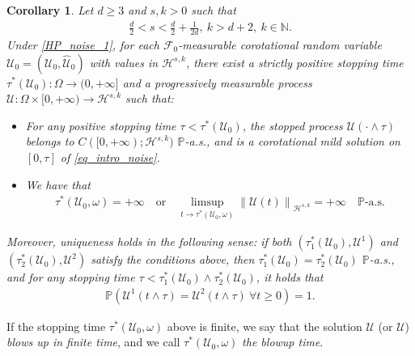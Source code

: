 \documentclass[12pt,reqno]{amsart}
\theoremstyle{plain}
\theoremstyle{remark}
\theoremstyle{plain}
\newtheorem{corollary}[theorem]{Corollary}
\theoremstyle{definition}
\numberwithin{equation}{section}
\numberwithin{equation}{section}
\def\N{{\mathbb N}}
\newcommand{\norm}[1]{\left\|#1\right\|}
\newcommand{\HH}{\mathcal{H}}
\begin{document}
 	\begin{corollary}\label{corollary_well_posed}
		Let $d\geq 3$ and $s,k>0$ such that 
		\begin{align*}
			\frac{d}{2}<s<\frac{d}{2}+\frac{1}{2d},\ k>d+2,\ k\in \N.
		\end{align*}
		Under \autoref{HP_noise_1},
		for each $\mathcal{F}_0$-measurable corotational random variable $\boldsymbol{\mathcal{U}}_0=(\mathcal{U}_0,\mathcal{\hat{U}}_{0})$ with values in $\HH^{s,k}$, there exist a strictly positive stopping time $\tau^*(\boldsymbol{\mathcal{U}}_0):\Omega\rightarrow (0,+\infty]$ and a progressively measurable process $\boldsymbol{\mathcal{U}}:\Omega\times [0,+\infty)\rightarrow \HH^{s,k}$ such that:
		\begin{itemize}[leftmargin=2em]
			\setlength{\itemsep}{1mm}
			\item[i)]  For any positive stopping time $\tau < \tau^*(\boldsymbol{\mathcal{U}}_0)$, the stopped process $\boldsymbol{\mathcal{U}}(\cdot \wedge \tau)$ belongs to $C([0, +\infty); \HH^{s,k})$ $\mathbb{P}$-a.s., and is a corotational mild solution on $[0, \tau]$ of \eqref{eq_intro_noise}.
			\item[ii)] We have that
			\begin{align*}
				\tau^*(\boldsymbol{\mathcal{U}}_0,\omega)=+\infty \quad \text{or} \quad \limsup_{t\rightarrow \tau^*(\boldsymbol{\mathcal{U}}_0,\omega)}\norm{\boldsymbol{\mathcal{U}}(t)}_{\HH^{s,k}}=+\infty\quad \mathbb{P}\text{-a.s.}
			\end{align*}   
		\end{itemize}
		Moreover, uniqueness holds in the following sense: if both $\left(\tau^{*}_1(\boldsymbol{\mathcal{U}}_0), \boldsymbol{\mathcal{U}}^1\right)$ and $\left(\tau^{*}_2(\boldsymbol{\mathcal{U}}_0), \boldsymbol{\mathcal{U}}^2\right)$ satisfy the conditions above, then $\tau^{*}_1(\boldsymbol{\mathcal{U}}_0) = \tau^{*}_2(\boldsymbol{\mathcal{U}}_0)$ $\mathbb{P}$-a.s., and for any stopping time $\tau < \tau^{*}_1(\boldsymbol{\mathcal{U}}_0) \wedge \tau^{*}_2(\boldsymbol{\mathcal{U}}_0)$, it holds that
		\begin{align*}
			\mathbb{P}\left(\boldsymbol{\mathcal{U}}^1(t \wedge \tau)=\boldsymbol{\mathcal{U}}^2(t \wedge \tau)\ \forall t\geq 0\right)=1.
		\end{align*}
	\end{corollary}
	If the stopping time $\tau^*(\boldsymbol{\mathcal{U}}_0,\omega)$ above is finite, we say that the solution $\boldsymbol{\mathcal{U}}$ (or $\mathcal{U}$) \emph{blows up in finite time}, and we call $\tau^*(\boldsymbol{\mathcal{U}}_0,\omega)$ \emph{the blowup time}.
\end{document}
